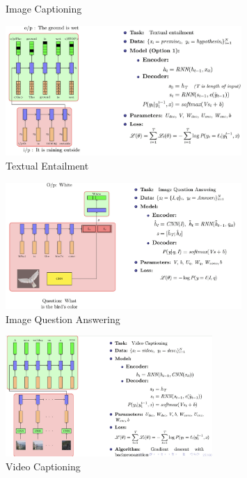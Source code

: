 \documentclass[a4paper]{article}
\begin{document}
\begin{itemize}
\begin{figure}[H]
        \caption{Image Captioning}
    \end{figure}
    \begin{figure}[H]
        \centering
        \includegraphics[width=0.8\textwidth]{Degree/static/DL_Encoder_decoder_1.png}
        \caption{Textual Entailment}
    \end{figure}
    \begin{figure}[H]
        \centering
        \includegraphics[width=0.8\textwidth]{Degree/static/DL_Encoder_decoder_2.png}
        \caption{Image Question Answering}
    \end{figure}
    \begin{figure}[H]
        \centering
        \includegraphics[width=0.7\textwidth]{Degree/static/DL_encoder_decoder_3.png}
        \caption{Video Captioning}
    \end{figure}
\end{itemize}
\end{document}
